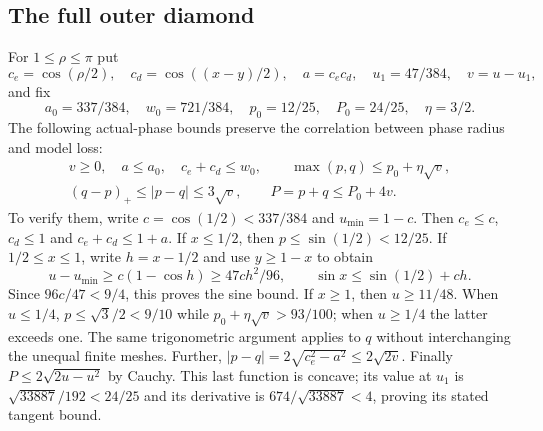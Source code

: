 \subsection{The full outer diamond}

For $1\leq\rho\leq\pi$ put
\[
 c_e=\cos(\rho/2),\quad c_d=\cos((x-y)/2),\quad a=c_ec_d,
 \quad u_1=47/384,\quad v=u-u_1,
\]
and fix
\[
 a_0=337/384,\quad w_0=721/384,\quad
 p_0=12/25,\quad P_0=24/25,\quad\eta=3/2.
\]
The following actual-phase bounds preserve the correlation between
phase radius and model loss:
\begin{equation}
 \begin{gathered}
 v\geq0,\quad a\leq a_0,\quad c_e+c_d\leq w_0,\qquad
 \max(p,q)\leq p_0+\eta\sqrt v,\\
 (q-p)_+\leq|p-q|\leq3\sqrt v,\qquad
 P=p+q\leq P_0+4v.
 \end{gathered}                                      \label{eq:argmax-outer-geometry}
\end{equation}
To verify them, write $c=\cos(1/2)<337/384$ and
$u_{\min}=1-c$.  Then $c_e\leq c$, $c_d\leq1$ and
$c_e+c_d\leq1+a$.  If $x\leq1/2$, then $p\leq\sin(1/2)<12/25$.
If $1/2\leq x\leq1$, write $h=x-1/2$ and use $y\geq1-x$ to obtain
\[
 u-u_{\min}\geq c(1-\cos h)\geq47ch^2/96,\qquad
 \sin x\leq\sin(1/2)+ch.
\]
Since $96c/47<9/4$, this proves the sine bound.  If $x\geq1$, then
$u\geq11/48$.  When $u\leq1/4$, $p\leq\sqrt3/2<9/10$ while
$p_0+\eta\sqrt v>93/100$; when $u\geq1/4$ the latter exceeds one.
The same trigonometric argument applies to $q$ without interchanging
the unequal finite meshes.  Further,
$|p-q|=2\sqrt{c_e^2-a^2}\leq2\sqrt{2v}$.
Finally $P\leq2\sqrt{2u-u^2}$ by Cauchy.  This last function is
concave; its value at $u_1$ is $\sqrt{33887}/192<24/25$ and its
derivative is $674/\sqrt{33887}<4$, proving its stated tangent bound.

